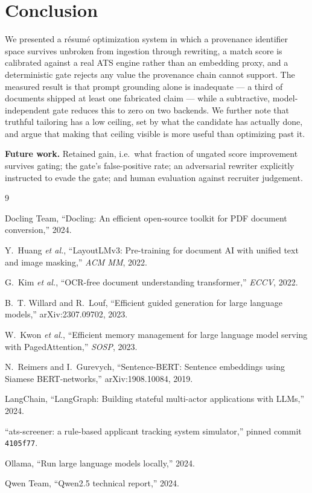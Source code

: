 \documentclass[conference]{IEEEtran}
\begin{document}
\section{Conclusion}

We presented a résumé optimization system in which a provenance identifier space
survives unbroken from ingestion through rewriting, a match score is calibrated
against a real ATS engine rather than an embedding proxy, and a deterministic
gate rejects any value the provenance chain cannot support. The measured result
is that prompt grounding alone is inadequate --- a third of documents shipped at
least one fabricated claim --- while a subtractive, model-independent gate
reduces this to zero on two backends. We further note that truthful tailoring
has a low ceiling, set by what the candidate has actually done, and argue that
making that ceiling visible is more useful than optimizing past it.

\textbf{Future work.} Retained gain, i.e.\ what fraction of ungated score
improvement survives gating; the gate's false-positive rate; an adversarial
rewriter explicitly instructed to evade the gate; and human evaluation against
recruiter judgement.

\begin{thebibliography}{9}
\balance

Docling Team, ``Docling: An efficient open-source toolkit for PDF document
conversion,'' 2024.

Y.~Huang \emph{et al.}, ``LayoutLMv3: Pre-training for document AI with unified
text and image masking,'' \emph{ACM MM}, 2022.

G.~Kim \emph{et al.}, ``OCR-free document understanding transformer,''
\emph{ECCV}, 2022.

B.~T. Willard and R.~Louf, ``Efficient guided generation for large language
models,'' arXiv:2307.09702, 2023.

W.~Kwon \emph{et al.}, ``Efficient memory management for large language model
serving with PagedAttention,'' \emph{SOSP}, 2023.

N.~Reimers and I.~Gurevych, ``Sentence-BERT: Sentence embeddings using Siamese
BERT-networks,'' arXiv:1908.10084, 2019.

LangChain, ``LangGraph: Building stateful multi-actor applications with LLMs,''
2024.

``ats-screener: a rule-based applicant tracking system simulator,'' pinned
commit \texttt{4105f77}.

Ollama, ``Run large language models locally,'' 2024.

Qwen Team, ``Qwen2.5 technical report,'' 2024.

\end{thebibliography}
\end{document}
